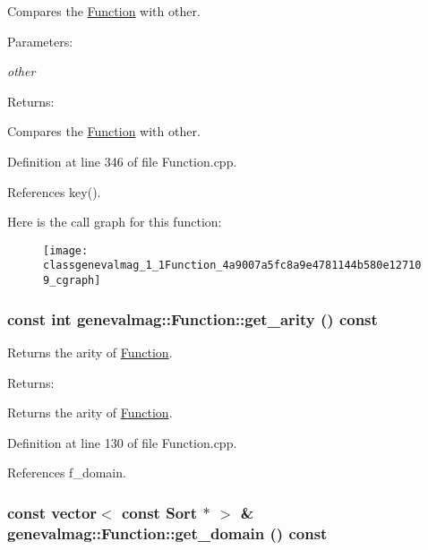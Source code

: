 Compares the \hyperlink{classgenevalmag_1_1Function}{Function} with other. \begin{Desc}
\item[Parameters:]
\begin{description}
\item[{\em other}]\end{description}
\end{Desc}
\begin{Desc}
\item[Returns:]\end{Desc}
Compares the \hyperlink{classgenevalmag_1_1Function}{Function} with other. 

Definition at line 346 of file Function.cpp.

References key().

Here is the call graph for this function:\nopagebreak
\begin{figure}[H]
\begin{center}
\leavevmode
\texttt{[image: classgenevalmag\_1\_1Function\_4a9007a5fc8a9e4781144b580e127109\_cgraph]}
\end{center}
\end{figure}
\hypertarget{classgenevalmag_1_1Function_30fc3347320a9cbeb37b8d45aac3737e}{
\subsubsection[{get\_\-arity}]{\setlength{\rightskip}{0pt plus 5cm}const int genevalmag::Function::get\_\-arity () const}}
\label{classgenevalmag_1_1Function_30fc3347320a9cbeb37b8d45aac3737e}


Returns the arity of \hyperlink{classgenevalmag_1_1Function}{Function}. \begin{Desc}
\item[Returns:]\end{Desc}
Returns the arity of \hyperlink{classgenevalmag_1_1Function}{Function}. 

Definition at line 130 of file Function.cpp.

References f\_\-domain.\hypertarget{classgenevalmag_1_1Function_cffc8f2df4197f05e095bc427fb13331}{
\subsubsection[{get\_\-domain}]{\setlength{\rightskip}{0pt plus 5cm}const vector$<$ const {\bf Sort} $\ast$ $>$ \& genevalmag::Function::get\_\-domain () const}}
\label{classgenevalmag_1_1Function_cffc8f2df4197f05e095bc427fb13331}


